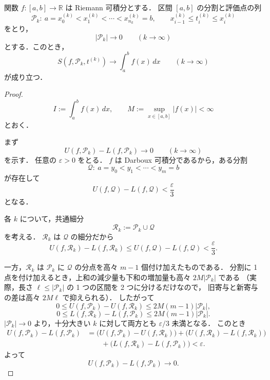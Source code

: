 













\begin{theorem}[区分求積法]
関数 $f:[a,b]\to\mathbb R$ は Riemann 可積分とする．
区間 $[a,b]$ の分割と評価点の列
\[
\mathcal P_k:\ a=x_0^{(k)}<x_1^{(k)}<\cdots<x_{n_k}^{(k)}=b,
\qquad
x_{i-1}^{(k)}\le t_i^{(k)}\le x_i^{(k)}
\]
をとり，
\[
|\mathcal P_k|\to 0\qquad (k\to\infty)
\]
とする．このとき，
\[
S(f,\mathcal P_k,t^{(k)})\to \int_a^b f(x)\,dx
\qquad (k\to\infty)
\]
が成り立つ．
\end{theorem}

\begin{proof}
\[
I:=\int_a^b f(x)\,dx,
\qquad
M:=\sup_{x\in[a,b]}|f(x)|<\infty
\]
とおく．

まず
\[
U(f,\mathcal P_k)-L(f,\mathcal P_k)\to 0
\qquad (k\to\infty)
\]
を示す．
任意の $\varepsilon>0$ をとる．
$f$ は Darboux 可積分であるから，ある分割
\[
\mathcal Q:\ a=y_0<y_1<\cdots<y_m=b
\]
が存在して
\[
U(f,\mathcal Q)-L(f,\mathcal Q)<\frac{\varepsilon}{3}
\]
となる．

各 $k$ について，共通細分
\[
\mathcal R_k:=\mathcal P_k\cup\mathcal Q
\]
を考える．
$\mathcal R_k$ は $\mathcal Q$ の細分だから
\[
U(f,\mathcal R_k)-L(f,\mathcal R_k)
\le
U(f,\mathcal Q)-L(f,\mathcal Q)
<
\frac{\varepsilon}{3}.
\]

一方，$\mathcal R_k$ は $\mathcal P_k$ に $\mathcal Q$ の分点を高々 $m-1$ 個付け加えたものである．
分割に 1 点を付け加えるとき，上和の減少量も下和の増加量も高々 $2M|\mathcal P_k|$ である
（実際，長さ $\ell\le |\mathcal P_k|$ の 1 つの区間を 2 つに分けるだけなので，
旧寄与と新寄与の差は高々 $2M\ell$ で抑えられる）．
したがって
\[
0\le U(f,\mathcal P_k)-U(f,\mathcal R_k)\le 2M(m-1)|\mathcal P_k|,
\]
\[
0\le L(f,\mathcal R_k)-L(f,\mathcal P_k)\le 2M(m-1)|\mathcal P_k|.
\]
$|\mathcal P_k|\to 0$ より，十分大きい $k$ に対して両方とも $\varepsilon/3$ 未満となる．
このとき
\[
\begin{aligned}
U(f,\mathcal P_k)-L(f,\mathcal P_k)
&=
\bigl(U(f,\mathcal P_k)-U(f,\mathcal R_k)\bigr)
+\bigl(U(f,\mathcal R_k)-L(f,\mathcal R_k)\bigr)\\
&\qquad
+\bigl(L(f,\mathcal R_k)-L(f,\mathcal P_k)\bigr)
<\varepsilon.
\end{aligned}
\]
よって
\[
U(f,\mathcal P_k)-L(f,\mathcal P_k)\to 0.
\]
\end{proof}


